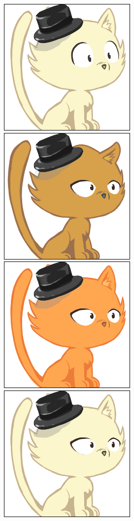 \documentclass[a4paper, 12pt]{article}
\begin{document}
  \includegraphics[scale=0.45]{out/9.png}
  \includegraphics[scale=0.45]{out/10.png}
  \includegraphics[scale=0.45]{out/11.png}
  \includegraphics[scale=0.45]{out/12.png}
\end{document}
